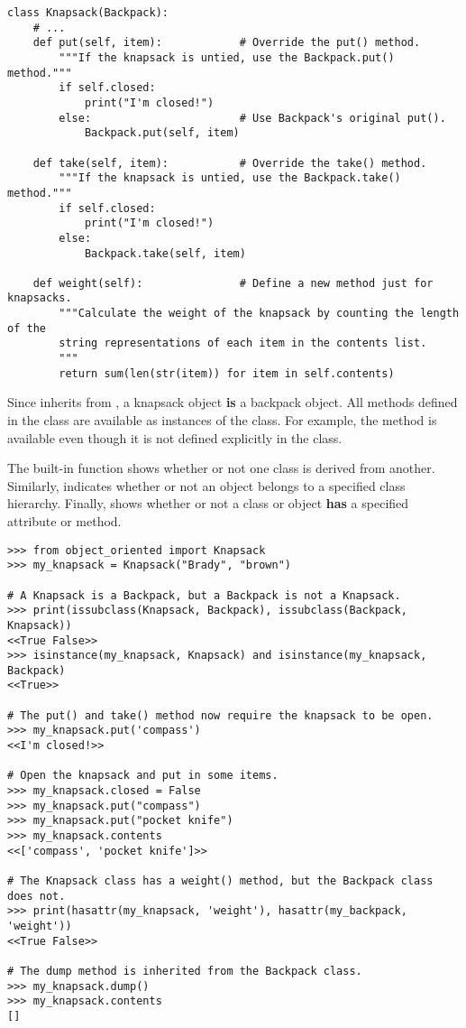 \begin{lstlisting}
class Knapsack(Backpack):
    # ...
    def put(self, item):            # Override the put() method.
        """If the knapsack is untied, use the Backpack.put() method."""
        if self.closed:
            print("I'm closed!")
        else:                       # Use Backpack's original put().
            Backpack.put(self, item)

    def take(self, item):           # Override the take() method.
        """If the knapsack is untied, use the Backpack.take() method."""
        if self.closed:
            print("I'm closed!")
        else:
            Backpack.take(self, item)

    def weight(self):               # Define a new method just for knapsacks.
        """Calculate the weight of the knapsack by counting the length of the
        string representations of each item in the contents list.
        """
        return sum(len(str(item)) for item in self.contents)
\end{lstlisting}

Since  inherits from , a knapsack object \textbf{is} a backpack object.
All methods defined in the  class are available as instances of the  class.
For example, the  method is available even though it is not defined explicitly in the  class.

The built-in function  shows whether or not one class is derived from another.
Similarly,  indicates whether or not an object belongs to a specified class hierarchy.
Finally,  shows whether or not a class or object \textbf{has} a specified attribute or method.

\begin{lstlisting}
>>> from object_oriented import Knapsack
>>> my_knapsack = Knapsack("Brady", "brown")

# A Knapsack is a Backpack, but a Backpack is not a Knapsack.
>>> print(issubclass(Knapsack, Backpack), issubclass(Backpack, Knapsack))
<<True False>>
>>> isinstance(my_knapsack, Knapsack) and isinstance(my_knapsack, Backpack)
<<True>>

# The put() and take() method now require the knapsack to be open.
>>> my_knapsack.put('compass')
<<I'm closed!>>

# Open the knapsack and put in some items.
>>> my_knapsack.closed = False
>>> my_knapsack.put("compass")
>>> my_knapsack.put("pocket knife")
>>> my_knapsack.contents
<<['compass', 'pocket knife']>>

# The Knapsack class has a weight() method, but the Backpack class does not.
>>> print(hasattr(my_knapsack, 'weight'), hasattr(my_backpack, 'weight'))
<<True False>>

# The dump method is inherited from the Backpack class.
>>> my_knapsack.dump()
>>> my_knapsack.contents
[]
\end{lstlisting}

